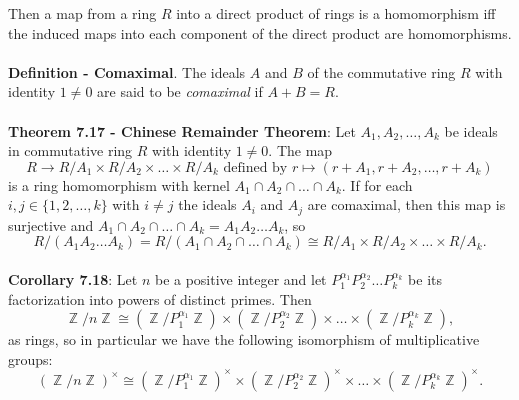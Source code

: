 \documentclass{article}
\DeclareMathOperator{\Z}{\mathbb{Z}}
\begin{document}
Then a map from a ring $R$ into a direct product of rings is a homomorphism iff the induced maps into each component of the direct product are homomorphisms. \\ \\
\textbf{Definition - Comaximal}. The ideals $A$ and $B$ of the commutative ring $R$ with identity $1 \neq 0$ are said to be \textit{comaximal} if $A + B = R$. \\ \\
\textbf{Theorem 7.17 - Chinese Remainder Theorem}: Let $A_1, A_2, \dots, A_k$ be ideals in commutative ring $R$ with identity $1 \neq 0$. The map $$R \rightarrow R/A_1 \times R/A_2 \times \dots \times R/A_k \text{ defined by } r \mapsto (r + A_1, r + A_2, \dots, r + A_k)$$ is a ring homomorphism with kernel $A_1 \cap A_2 \cap \dots \cap A_k.$ If for each $i, j \in \{ 1, 2, \dots, k\}$ with $i \neq j$ the ideals $A_i$ and $A_j$ are comaximal, then this map is surjective and $A_1 \cap A_2 \cap \dots \cap A_k = A_1 A_2 \dots A_k$, so $$R / (A_1 A_2 \dots A_k) = R / (A_1 \cap A_2 \cap \dots \cap A_k) \cong R/A_1 \times R/A_2 \times \dots \times R/A_k.$$ \\
\textbf{Corollary 7.18}: Let $n$ be a positive integer and let $P_1^{\alpha_1} P_2^{\alpha_2} \dots P_k^{\alpha_k}$ be its factorization into powers of distinct primes. Then $$\Z/n\Z \cong (\Z/P_1^{\alpha_1}\Z) \times (\Z/P_2^{\alpha_2}\Z) \times \dots \times (\Z/P_k^{\alpha_k}\Z),$$ as rings, so in particular we have the following isomorphism of multiplicative groups: $$(\Z/n\Z)^\times \cong (\Z/P_1^{\alpha_1}\Z)^\times \times (\Z/P_2^{\alpha_2}\Z)^\times \times \dots \times (\Z/P_k^{\alpha_k}\Z)^\times.$$
\end{document}
